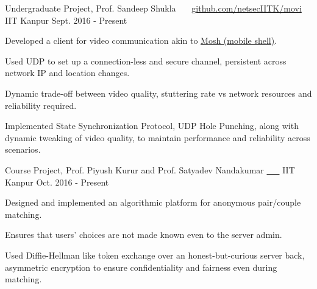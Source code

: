


\begin{cventries}


  \cventry
  {Undergraduate Project, Prof. Sandeep Shukla}
  {\href{https://github.com/netsecIITK/moVi}{}
    \ \ \ \normalfont\href{https://github.com/netsecIITK/moVi}
    {github.com/netsecIITK/movi}}
  {IIT Kanpur}
  {Sept. 2016 - Present}
  {
    \begin{cvitems}
    \item Developed a client for video communication
      akin to \href{https://mosh.org/}{Mosh (mobile shell)}.
    \item Used UDP to set up a connection-less and secure channel,
      persistent across network IP and location changes.
    \item Dynamic trade-off between video quality, stuttering rate vs network
      resources and reliability required.
    \item Implemented State Synchronization Protocol, UDP Hole
      Punching, along with dynamic tweaking of video quality, to
      maintain performance and reliability across scenarios.
    \end{cvitems}
  }

  \cventry
  {Course Project, Prof. Piyush Kurur and
    Prof. Satyadev Nandakumar}
  {\href{https://github.com/pclubiitk/puppy-love}{
      \ \ \ }}
  {IIT Kanpur}
  {Oct. 2016 - Present}
  {
    \begin{cvitems}
      \item Designed and implemented an algorithmic platform
        for anonymous pair/couple matching.
      \item Ensures that users' choices are not made known even to the
        server admin.
      \item Used Diffie-Hellman like token exchange over an
        honest-but-curious server back, asymmetric encryption to
        ensure confidentiality and fairness even during matching.
    \end{cvitems}
  }


\end{cventries}
